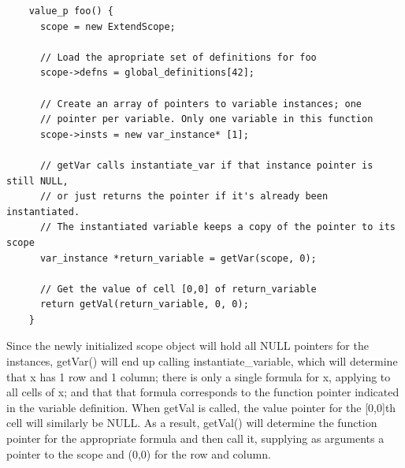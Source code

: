   \begin{lstlisting}
    value_p foo() {
      scope = new ExtendScope;

      // Load the apropriate set of definitions for foo
      scope->defns = global_definitions[42];

      // Create an array of pointers to variable instances; one
      // pointer per variable. Only one variable in this function
      scope->insts = new var_instance* [1];

      // getVar calls instantiate_var if that instance pointer is still NULL,
      // or just returns the pointer if it's already been instantiated.
      // The instantiated variable keeps a copy of the pointer to its scope
      var_instance *return_variable = getVar(scope, 0);

      // Get the value of cell [0,0] of return_variable
      return getVal(return_variable, 0, 0);
    }
  \end{lstlisting}
  \medskip \noindent

  Since the newly initialized scope object will hold all NULL pointers for the instances, getVar() will end up calling instantiate\_variable, which will  determine that x has 1 row and 1 column; there is only a single formula for x, applying to all cells of x; and that that formula corresponds to the function pointer indicated in the variable definition.
  When getVal is called, the value pointer for the [0,0]th cell will similarly be NULL. As a result, getVal() will determine the function pointer for the appropriate formula and then call it, supplying as arguments a pointer to the scope and (0,0) for the row and column.

